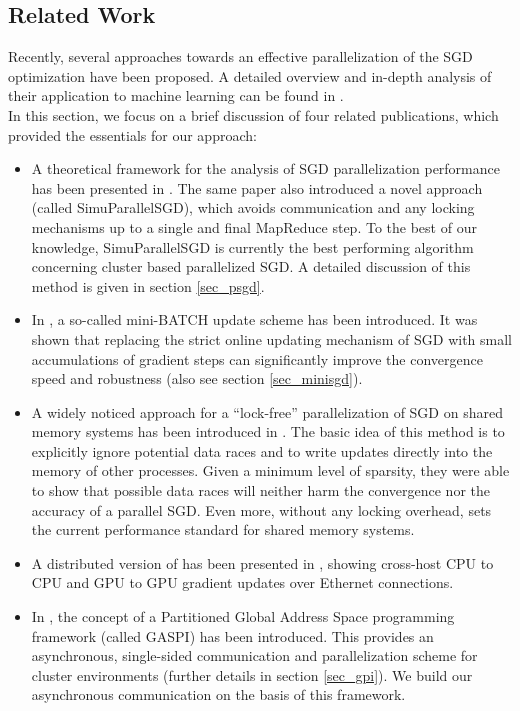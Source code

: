 \documentclass{acm_proc_article-sp}
\begin{document}
\subsection{Related Work} 
Recently, several approaches \cite{dean2012large}\cite{SGDsmola}\cite{sculley2010web}
\cite{recht2011hogwild}\cite{ngiam2011optimization} 
towards an effective parallelization
of the SGD optimization have been proposed. A detailed overview and in-depth
analysis of their application to machine learning can be found in \cite{SGDsmola}.\\
In this section, we focus on a brief discussion of four related publications, 
which provided the essentials for our approach:       
\begin{itemize} 
\item A theoretical framework for the analysis 
of SGD parallelization performance has been presented in \cite{SGDsmola}. 
The same paper also introduced a novel approach 
(called SimuParallelSGD), which 
avoids communication and any locking mechanisms up to a single and final 
MapReduce step. To the best of our knowledge, SimuParallelSGD 
is currently the best performing algorithm concerning cluster based 
parallelized SGD. A detailed discussion of this method is given in section 
\ref{sec_psgd}.
\item In \cite{sculley2010web}, a so-called mini-BATCH update scheme 
has been introduced. 
It was shown that replacing the strict online 
updating mechanism of SGD with small accumulations of gradient steps can 
significantly improve the convergence speed and robustness (also see
section \ref{sec_minisgd}).   
\item A widely noticed approach for a 
``lock-free'' parallelization of SGD on shared memory systems
has been introduced in \cite{recht2011hogwild}. The basic idea 
of this method is to explicitly ignore potential data races and to write
updates directly into the memory of other processes. Given a minimum level
of sparsity, they were able to show that possible data races will neither harm 
the convergence nor the accuracy of a parallel SGD. Even more, without
any locking overhead, \cite{recht2011hogwild} sets the current performance 
standard for shared memory systems.       
\item A distributed version of \cite{recht2011hogwild} has been presented in 
\cite{noel2014dogwild}, showing cross-host CPU to CPU and GPU to GPU gradient  
updates over Ethernet connections. 
\item In \cite{grunewald2013gaspi}, the concept of a  Partitioned 
Global Address Space programming framework (called GASPI) has been introduced. 
This provides an asynchronous, 
single-sided communication
and parallelization scheme for cluster environments (further details in section 
\ref{sec_gpi}). We build our asynchronous communication on the basis of this framework.     
\end{itemize}
\newpage
\end{document}
